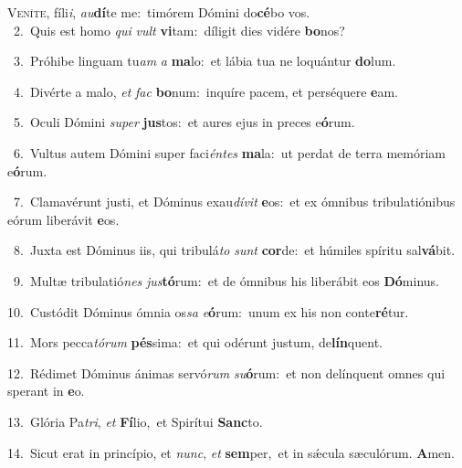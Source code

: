 \lettrine{\initial\textcolor{\initialcolor}{V}}{eníte,} fíli\-\textit{i}\-, \textit{au}\-\textbf{dí}te me:~\star timórem Dómini do\-\textbf{cé}\-bo vos.\\
{\numbfont\textcolor{\numbcolor}{~2.}}~Quis est homo \textit{qui} \textit{vult} \textbf{vi}\-tam:~\star díligit dies vidére \textbf{bo}\-nos?\par
{\numbfont\textcolor{\numbcolor}{~3.}}~Próhibe linguam tu\textit{am} \textit{a} \textbf{ma}\-lo:~\star et lábia tua ne loquántur \textbf{do}\-lum.\par
{\numbfont\textcolor{\numbcolor}{~4.}}~Divérte a malo, \textit{et} \textit{fac} \textbf{bo}\-num:~\star inquíre pacem, et perséquere \textbf{e}\-am.\par
{\numbfont\textcolor{\numbcolor}{~5.}}~Oculi Dómini \textit{su}\-\textit{per} \textbf{jus}\-tos:~\star et aures ejus in preces e\-\textbf{ó}\-rum.\par
{\numbfont\textcolor{\numbcolor}{~6.}}~Vultus autem Dómini super faci\-\textit{én}\-\textit{tes} \textbf{ma}\-la:~\star ut perdat de terra memóriam e\-\textbf{ó}\-rum.\par
{\numbfont\textcolor{\numbcolor}{~7.}}~Clamavérunt justi, et Dóminus exau\-\textit{dí}\-\textit{vit} \textbf{e}\-os:~\star et ex ómnibus tribulatiónibus eórum liberávit \textbf{e}\-os.\par
{\numbfont\textcolor{\numbcolor}{~8.}}~Juxta est Dóminus iis, qui tribulá\textit{to} \textit{sunt} \textbf{cor}\-de:~\star et húmiles spíritu sal\-\textbf{vá}\-bit.\par
{\numbfont\textcolor{\numbcolor}{~9.}}~Multæ tribulatió\textit{nes} \textit{jus}\-\textbf{tó}rum:~\star et de ómnibus his liberábit eos \textbf{Dó}\-minus.\par
{\numbfont\textcolor{\numbcolor}{10.}}~Custódit Dóminus ómnia os\textit{sa} \textit{e}\-\textbf{ó}rum:~\star unum ex his non conte\-\textbf{ré}\-tur.\par
{\numbfont\textcolor{\numbcolor}{11.}}~Mors pecca\-\textit{tó}\-\textit{rum} \textbf{pés}\-sima:~\star et qui odérunt justum, de\-\textbf{lín}\-quent.\par
{\numbfont\textcolor{\numbcolor}{12.}}~Rédimet Dóminus ánimas servó\textit{rum} \textit{su}\-\textbf{ó}rum:~\star et non delínquent omnes qui sperant in \textbf{e}\-o.\par
{\numbfont\textcolor{\numbcolor}{13.}}~Glória Pa\-\textit{tri}\-, \textit{et} \textbf{Fí}\-lio,~\star et Spirítui \textbf{Sanc}\-to.\par
{\numbfont\textcolor{\numbcolor}{14.}}~Sicut erat in princípio, et \textit{nunc}\-, \textit{et} \textbf{sem}\-per,~\star et in sǽcula sæculórum. \textbf{A}\-men.\par
